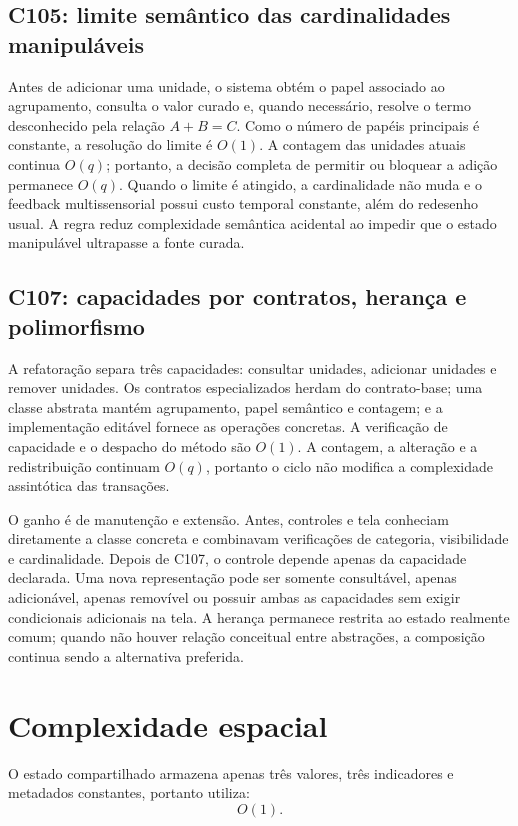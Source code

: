 \documentclass[12pt,a4paper]{article}
\begin{document}
\subsection{C105: limite semântico das cardinalidades manipuláveis}
Antes de adicionar uma unidade, o sistema obtém o papel associado ao agrupamento, consulta o valor curado e, quando necessário, resolve o termo desconhecido pela relação $A+B=C$. Como o número de papéis principais é constante, a resolução do limite é $O(1)$. A contagem das unidades atuais continua $O(q)$; portanto, a decisão completa de permitir ou bloquear a adição permanece $O(q)$. Quando o limite é atingido, a cardinalidade não muda e o feedback multissensorial possui custo temporal constante, além do redesenho usual. A regra reduz complexidade semântica acidental ao impedir que o estado manipulável ultrapasse a fonte curada.

\subsection{C107: capacidades por contratos, herança e polimorfismo}
A refatoração separa três capacidades: consultar unidades, adicionar unidades e remover unidades. Os contratos especializados herdam do contrato-base; uma classe abstrata mantém agrupamento, papel semântico e contagem; e a implementação editável fornece as operações concretas. A verificação de capacidade e o despacho do método são $O(1)$. A contagem, a alteração e a redistribuição continuam $O(q)$, portanto o ciclo não modifica a complexidade assintótica das transações.

O ganho é de manutenção e extensão. Antes, controles e tela conheciam diretamente a classe concreta e combinavam verificações de categoria, visibilidade e cardinalidade. Depois de C107, o controle depende apenas da capacidade declarada. Uma nova representação pode ser somente consultável, apenas adicionável, apenas removível ou possuir ambas as capacidades sem exigir condicionais adicionais na tela. A herança permanece restrita ao estado realmente comum; quando não houver relação conceitual entre abstrações, a composição continua sendo a alternativa preferida.

\section{Complexidade espacial}

O estado compartilhado armazena apenas três valores, três indicadores e metadados constantes, portanto utiliza:
\[
O(1).
\]
\end{document}
